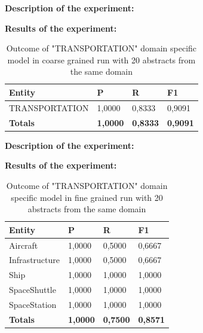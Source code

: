 \documentclass[thesis=M,english]{FITthesis}[2018/05/30]
\begin{document}
\textbf{Description of the experiment:}

\textbf{Results of the experiment:}

	\begin{table}[H]\centering
		\begin{tabular}{|l|l|l|l|}
			\hline {\textbf{Entity}} & {\textbf{P}} & {\textbf{R}} & {\textbf{F1}}\\\hline
				TRANSPORTATION & 1,0000 & 0,8333 & 0,9091\\\hline
				\textbf{Totals} & \textbf{1,0000} & \textbf{0,8333} & \textbf{0,9091}\\\hline
		\end{tabular}
		\caption{Outcome of "TRANSPORTATION" domain specific model in coarse grained run with 20 abstracts from the same domain \label{table:TransportationDomainWithTransportationTop20Coarse}}			
	\end{table}	
	
\textbf{Description of the experiment:}

\textbf{Results of the experiment:}	

	\begin{table}[H]\centering
		\begin{tabular}{|l|l|l|l|}
			\hline {\textbf{Entity}} & {\textbf{P}} & {\textbf{R}} & {\textbf{F1}}\\\hline
				Aircraft & 1,0000 & 0,5000 & 0,6667\\
				Infrastructure & 1,0000 & 0,5000 & 0,6667\\
				Ship & 1,0000 & 1,0000 & 1,0000\\				
				SpaceShuttle & 1,0000 & 1,0000 & 1,0000\\
				SpaceStation & 1,0000 & 1,0000 & 1,0000\\\hline
				\textbf{Totals} & \textbf{1,0000} & \textbf{0,7500} & \textbf{0,8571}\\\hline
		\end{tabular}
		\caption{Outcome of "TRANSPORTATION" domain specific model in fine grained run with 20 abstracts from the same domain \label{table:TransportationDomainWithTransportationTop20Fine}}			
	\end{table}
	
	

	
\end{document}

